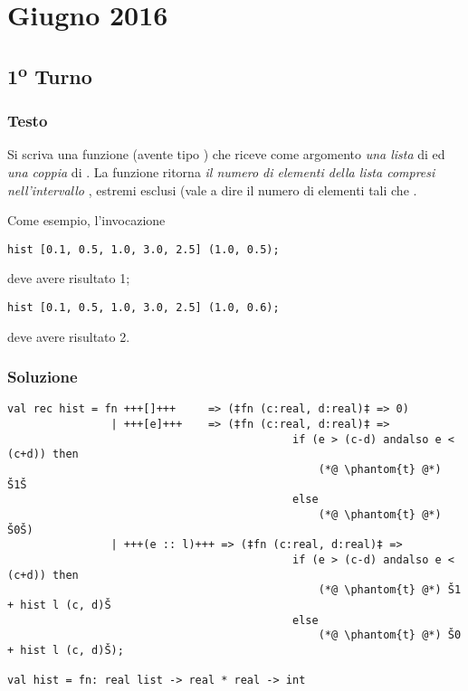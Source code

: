 \section{Giugno 2016}

\subsection{1\textsuperscript{o} Turno}

\subsubsection{Testo}

Si scriva una funzione  (avente tipo ) che riceve come argomento \emph{una lista} di  ed \emph{una coppia} di .
La funzione  ritorna \emph{il numero di elementi della lista compresi nell'intervallo }, estremi esclusi (vale a dire il numero di elementi  tali che .

\medskip
Come esempio, l'invocazione

\begin{lstlisting}
hist [0.1, 0.5, 1.0, 3.0, 2.5] (1.0, 0.5);
\end{lstlisting}

deve avere risultato 1;

\begin{lstlisting}
hist [0.1, 0.5, 1.0, 3.0, 2.5] (1.0, 0.6);
\end{lstlisting}

deve avere risultato 2.

\subsubsection{Soluzione}

\begin{lstlisting}[style = SML, caption = {Definizione della funzione \sml{hist}}]
val rec hist = fn +++[]+++	   => (‡fn (c:real, d:real)‡ => 0)
				| +++[e]+++	   => (‡fn (c:real, d:real)‡ =>
											if (e > (c-d) andalso e < (c+d)) then
												(*@ \phantom{t} @*) Š1Š
											else
												(*@ \phantom{t} @*) Š0Š)
				| +++(e :: l)+++ => (‡fn (c:real, d:real)‡ =>
											if (e > (c-d) andalso e < (c+d)) then
												(*@ \phantom{t} @*) Š1 + hist l (c, d)Š
											else
												(*@ \phantom{t} @*) Š0 + hist l (c, d)Š);

val hist = fn: real list -> real * real -> int
\end{lstlisting}

